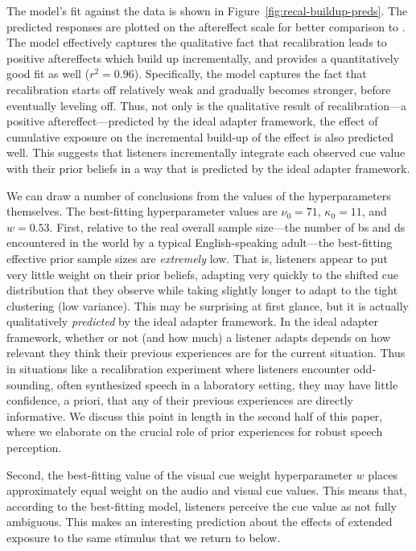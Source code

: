 The model's fit against the data is shown in Figure~\ref{fig:recal-buildup-preds}. The predicted responses are plotted on the aftereffect scale for better comparison to . The model effectively captures the qualitative fact that recalibration leads to positive aftereffects which  build up incrementally, and provides a quantitatively good fit as well ($r^2=0.96$).  Specifically, the model captures the fact that recalibration starts off relatively weak and gradually becomes stronger, before eventually leveling off.  Thus, not only is the qualitative result of recalibration---a positive aftereffect---predicted by the ideal adapter framework, the effect of cumulative exposure on the incremental build-up of the effect is also predicted well.  This suggests that listeners incrementally integrate each observed cue value with their prior beliefs in a way that is predicted by the ideal adapter framework.

We can draw a number of conclusions from the values of the hyperparameters themselves.
The best-fitting hyperparameter values are $\nu_0=71$, $\kappa_0=11$, and $w=0.53$.
First,
relative to the real overall sample size---the number of \ph bs and \ph ds encountered in the world by a typical English-speaking adult---the best-fitting effective prior sample sizes are \emph{extremely} low.
That is, listeners appear to put very little weight on their prior beliefs, adapting very quickly to the shifted cue distribution that they observe while taking slightly longer to adapt to the tight clustering (low variance).
This may be surprising at first glance, but it is actually qualitatively \emph{predicted} by the ideal adapter framework.
In the ideal adapter framework, whether or not (and how much) a listener adapts depends on how relevant they think their previous experiences are for the current situation. Thus in situations like a recalibration experiment where listeners encounter odd-sounding, often synthesized speech in a laboratory setting, they may have little confidence, a priori, that any of their previous experiences are directly informative. We discuss this point in length in the second half of this paper, where we elaborate on the crucial role of prior experiences for robust speech perception.

Second, the best-fitting value of the visual cue weight hyperparameter $w$ places approximately equal weight on the audio and visual cue values.  This means that, according to the best-fitting model, listeners perceive the cue value as not fully ambiguous. This makes an interesting prediction about the effects of extended exposure to the same stimulus that we return to below. %

